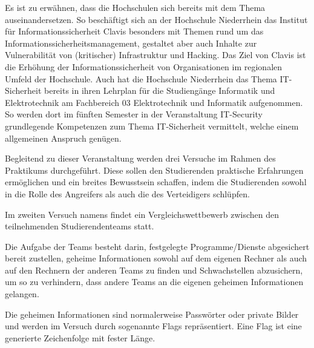 Es ist zu erwähnen, dass die Hochschulen sich bereits mit dem Thema auseinandersetzen. 
So beschäftigt sich an der Hochschule Niederrhein das Institut für Informationssicherheit Clavis besonders mit Themen rund um das Informationssicherheitsmanagement, gestaltet aber auch Inhalte zur Vulnerabilität von (kritischer) Infrastruktur und Hacking.
Das Ziel von Clavis ist die Erhöhung der Informationssicherheit von Organisationen im regionalen Umfeld der Hochschule.
\cite{hochschuleniederrheinFlyerInstitutClavis}
Auch hat die Hochschule Niederrhein das Thema IT-Sicherheit bereits in ihren Lehrplan für die Studiengänge Informatik und Elektrotechnik am Fachbereich 03 Elektrotechnik und Informatik aufgenommen. So werden dort im fünften Semester in der Veranstaltung IT-Security grundlegende Kompetenzen zum Thema IT-Sicherheit vermittelt, welche einem allgemeinen Anspruch genügen. \cite{hochschuleniederrheinModulhandbuchVollzeitBA2019}

Begleitend zu dieser Veranstaltung werden drei Versuche im Rahmen des Praktikums durchgeführt. Diese sollen den Studierenden praktische Erfahrungen ermöglichen und ein breites Bewusstsein schaffen, indem die Studierenden sowohl in die Rolle des Angreifers als auch die des Verteidigers schlüpfen.

Im zweiten Versuch namens  findet ein Vergleichswettbewerb zwischen den teilnehmenden Studierendenteams statt.

Die Aufgabe der Teams besteht darin, festgelegte Programme/Dienste abgesichert bereit zustellen, geheime Informationen sowohl auf dem eigenen Rechner als auch auf den Rechnern der anderen Teams zu finden und Schwachstellen abzusichern, um so zu verhindern, dass andere Teams an die eigenen geheimen Informationen gelangen. \cite[S. 2]{sosnaKonzeptionUndRealisierung2010} 

Die geheimen Informationen sind normalerweise Passwörter oder private Bilder und werden im Versuch durch sogenannte Flags repräsentiert. Eine Flag ist eine generierte Zeichenfolge mit fester Länge.